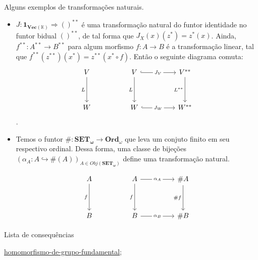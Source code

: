 \begin{ex}
	Alguns exemplos de transformações naturais.
 
    \begin{itemize}
        \item $J:\mathbf{1_{\mathbf{Vec(\mathbb{K})}}} \Longrightarrow ()^{**} $ é uma transformação natural do funtor identidade no funtor bidual $()^{**}$, de tal forma que $J_X(x)(z^*) = z^*(x)$. Ainda, $f^{**}: A^{**} \longrightarrow B^{**}$ para algum morfismo $f: A \longrightarrow B$ é a transformação linear, tal que $f^{**}(z^{**})(x^*) = z^{**}(x^{*} \circ f)$. Então o seguinte diagrama comuta:
\[\begin{tikzcd}
	V && V && {V^{**}} \\
	\\
	W && W && {W^{**}}
	\arrow["L"', from=1-1, to=3-1]
	\arrow["{J_V}"{description}, hook, from=1-3, to=1-5]
	\arrow["L"', from=1-3, to=3-3]
	\arrow["{L^{**}}"', from=1-5, to=3-5]
	\arrow["{J_W}"{description}, hook, from=3-3, to=3-5]
\end{tikzcd}\].

\item Temos o funtor $\#: \mathbf{SET_\omega} \longrightarrow \mathbf{Ord}_\omega$ que leva um conjuto finito em seu respectivo ordinal. Dessa forma, uma classe de bijeções $(\alpha_A: A \hookrightarrow \#(A))_{A \in Obj(\mathbf{SET_\omega})}$ define uma transformação natural.

\[\begin{tikzcd}
	A && A && {\#A} \\
	\\
	B && B && {\#B}
	\arrow["f"', from=1-1, to=3-1]
	\arrow["{\alpha_A}"{description}, from=1-3, to=1-5]
	\arrow["f"', from=1-3, to=3-3]
	\arrow["{\#f}"', from=1-5, to=3-5]
	\arrow["{\alpha_B}"{description}, from=3-3, to=3-5]
\end{tikzcd}\]


        
    \end{itemize}
\end{ex}


\begin{titlemize}{Lista de consequências}
	\item \hyperref[homomorfismo-de-grupo-fundamental]{homomorfismo-de-grupo-fundamental};\\ %
\end{titlemize}
